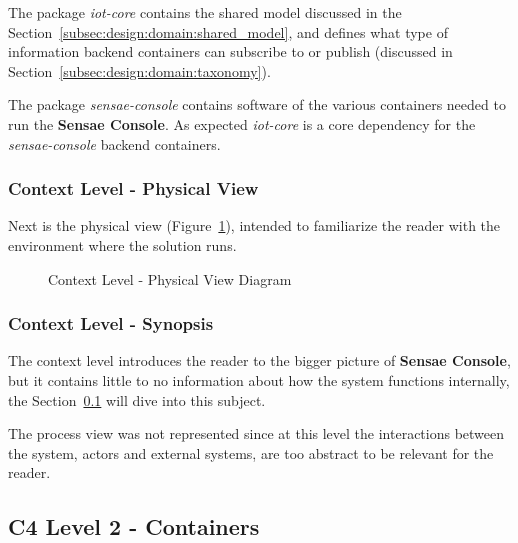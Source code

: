 The package \textit{iot-core} contains the shared model discussed in the Section~\ref{subsec:design:domain:shared_model}, and defines what type of information backend containers can subscribe to or publish (discussed in Section~\ref{subsec:design:domain:taxonomy}).

The package \textit{sensae-console} contains software of the various containers needed to run the \textbf{Sensae Console}. As expected \textit{iot-core} is a core dependency for the \textit{sensae-console} backend containers.

\subsubsection*{Context Level - Physical View}
\label{subsubsec:design:architecture:context:physical}

Next is the physical view (Figure~\ref{fig:design:architecture:context:physical:diagram}), intended to familiarize the reader with the environment where the solution runs.

\begin{figure}[H]
   \centering
   \resizebox{\columnwidth}{!}
   {
      
   }
   \caption[Context Level - Physical View Diagram]{Context Level - Physical View Diagram}
   \label{fig:design:architecture:context:physical:diagram}
\end{figure}

\subsubsection*{Context Level - Synopsis}
\label{subsubsec:design:architecture:context:synopsis}

The context level introduces the reader to the bigger picture of \textbf{Sensae Console}, but it contains little to no information about how the system functions internally, the Section~\ref{subsec:design:architecture:containers} will dive into this subject.

The process view was not represented since at this level the interactions between the system, actors and external systems, are too abstract to be relevant for the reader.

\subsection{C4 Level 2 - Containers}
\label{subsec:design:architecture:containers}

